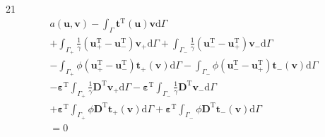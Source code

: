 \documentclass[a4paper,12pt]{article}
\begin{document}
21
\begin{equation}
\begin{split}
a(\mathbf{u},\mathbf{v})
-
\int_\Gamma
\mathbf{t}^\textrm{T}(\mathbf{u})\mathbf{v}
\textrm{d}\Gamma
\\+
\int_{\Gamma_+}
\frac{1}{\gamma}
(\mathbf{u}_+^\textrm{T} - \mathbf{u}_-^\textrm{T})
\mathbf{v}_+
\textrm{d}\Gamma
+
\int_{\Gamma_-}
\frac{1}{\gamma}
(\mathbf{u}_-^\textrm{T} - \mathbf{u}_+^\textrm{T})
\mathbf{v}_-
\textrm{d}\Gamma
\\-
\int_{\Gamma_+}
\phi
(\mathbf{u}_+^\textrm{T} - \mathbf{u}_-^\textrm{T})
\mathbf{t}_+(\mathbf{v})
\textrm{d}\Gamma
-
\int_{\Gamma_-}
\phi
(\mathbf{u}_-^\textrm{T} - \mathbf{u}_+^\textrm{T})
\mathbf{t}_-(\mathbf{v})
\textrm{d}\Gamma
\\-
{\boldsymbol\varepsilon}^\textrm{T}
\int_{\Gamma_+}
\frac{1}{\gamma}
\mathbf{D}^\textrm{T}
\mathbf{v}_+
\textrm{d}\Gamma
-
{\boldsymbol\varepsilon}^\textrm{T}
\int_{\Gamma_-}
\frac{1}{\gamma}
\mathbf{D}^\textrm{T}
\mathbf{v}_-
\textrm{d}\Gamma
\\+
{\boldsymbol\varepsilon}^\textrm{T}
\int_{\Gamma_+}
\phi\mathbf{D}^\textrm{T}
\mathbf{t}_+(\mathbf{v})
\textrm{d}\Gamma
+
{\boldsymbol\varepsilon}^\textrm{T}
\int_{\Gamma_-}
\phi\mathbf{D}^\textrm{T}
\mathbf{t}_-(\mathbf{v})
\textrm{d}\Gamma
\\=
0
\end{split}
\end{equation}
\end{document}
